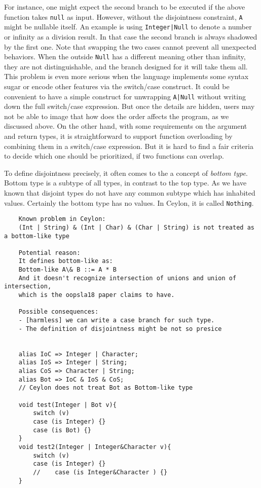 For instance, one might expect the second branch to be executed if the above
function takes \lstinline{null} as input.
However, without the disjointness constraint, \lstinline{A} might be nullable itself.
An example is using \lstinline{Integer|Null} to denote a number or infinity
as a division result.
In that case the second branch is always shadowed by the first one.
Note that swapping the two cases cannot prevent all unexpected behaviors.
When the outside \lstinline{Null} has a different meaning other than infinity,
they are not distinguishable, and the branch designed for it will take them all.
This problem is even more serious when the language implements some syntax
sugar or encode other features via the switch/case construct.
It could be convenient to have a simple construct for unwrapping \lstinline{A|Null} without writing down the full switch/case expression.
But once the details are hidden, users may not be able to image that how does
the order affects the program, as we discussed above.  
On the other hand, with some requirements on the argument and return types, it is 
straightforward to support function overloading by combining them in a switch/case expression.
But it is hard to find a fair criteria to decide which one should be prioritized,
if two functions can overlap.

To define disjointness precisely, it often comes to the a concept of \emph{bottom type}.
Bottom type is a subtype of all types, in contrast to the top type.
As we have known that disjoint types do not have any common subtype which has
inhabited values. Certainly the bottom type has no values.
In Ceylon, it is called \lstinline{Nothing}.

\begin{verbatim}
	Known problem in Ceylon:
	(Int | String) & (Int | Char) & (Char | String) is not treated as a bottom-like type
	
	Potential reason:
	It defines bottom-like as:
	Bottom-like A\& B ::= A * B
	And it doesn't recognize intersection of unions and union of intersection,
	which is the oopsla18 paper claims to have.
	
	Possible consequences:
	- [harmless] we can write a case branch for such type.
	- The definition of disjointness might be not so presice
	
	
	alias IoC => Integer | Character;
	alias IoS => Integer | String;
	alias CoS => Character | String;
	alias Bot => IoC & IoS & CoS;
	// Ceylon does not treat Bot as Bottom-like type
	
	void test(Integer | Bot v){
		switch (v)
		case (is Integer) {}
		case (is Bot) {}
	}
	void test2(Integer | Integer&Character v){
		switch (v)
		case (is Integer) {}
		//    case (is Integer&Character ) {}
	}
	
\end{verbatim}

